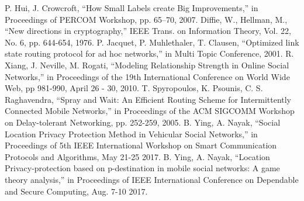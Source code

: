 \documentclass[conference]{IEEEtran}
\begin{document}
\begin{thebibliography}{00}
 P. Hui, J. Crowcroft, ``How Small Labels create Big Improvements,'' in Proceedings of PERCOM Workshop, pp. 65–70, 2007. 
 Diffie, W., Hellman, M., ``New directions in cryptography,'' IEEE Trans. on Information Theory, Vol. 22, No. 6, pp. 644-654, 1976.
  P. Jacquet, P. Muhlethaler, T. Clausen, ``Optimized link state routing protocol for ad hoc networks,'' in Multi Topic Conference, 2001.
 R. Xiang, J. Neville, M. Rogati, ``Modeling Relationship Strength in Online Social Networks,'' in Proceedings of the 19th International Conference on World Wide Web, pp 981-990, April 26 - 30, 2010.
 T. Spyropoulos, K. Psounis, C. S. Raghavendra, ``Spray and Wait: An Efficient Routing Scheme for Intermittently Connected Mobile Networks,'' in Proceedings of the ACM SIGCOMM Workshop on Delay-tolerant Networking, pp. 252-259, 2005.
 B. Ying, A. Nayak, ``Social Location Privacy Protection Method in Vehicular Social Networks,'' in Proceedings of 5th IEEE International Workshop on Smart Communication Protocols and Algorithms, May 21-25 2017.
 B. Ying, A. Nayak, ``Location Privacy-protection based on p-destination in mobile social networks: A game theory analysis,'' in Proceedings of IEEE International Conference on Dependable and Secure Computing, Aug. 7-10 2017.
\end{thebibliography}
\end{document}
